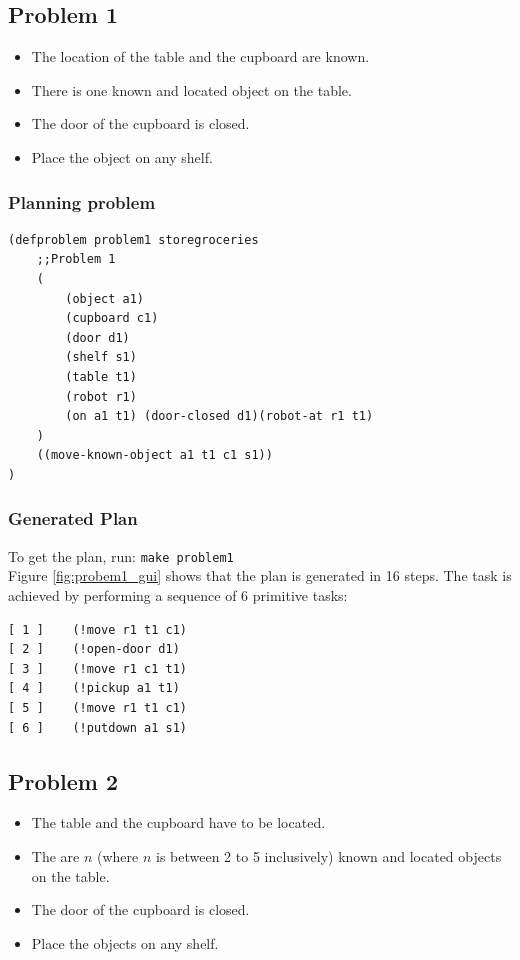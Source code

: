 \documentclass[paper=a4, fontsize=11pt]{scrartcl}
\begin{document}
	\subsection{Problem 1}

	\begin{itemize}
		\item The location of the table and the cupboard are known.
		\item There is one known and located object on the table.
		\item The door of the cupboard is closed.
		\item Place the object on any shelf.
	\end{itemize}

	\newpage

	\subsubsection*{Planning problem}

	\begin{lstlisting}
(defproblem problem1 storegroceries
	;;Problem 1
	(
		(object a1)
		(cupboard c1)
		(door d1)
		(shelf s1)
		(table t1)
		(robot r1)
		(on a1 t1) (door-closed d1)(robot-at r1 t1)
	)
	((move-known-object a1 t1 c1 s1))
)
	\end{lstlisting}

	\subsubsection*{Generated Plan}

	To get the plan, run: \verb|make problem1| \\

	Figure \ref{fig:probem1_gui} shows that the plan is generated in 16 steps. The task is achieved by performing a sequence of 6 primitive tasks: \\

	\begin{lstlisting}
[ 1 ]    (!move r1 t1 c1)
[ 2 ]    (!open-door d1)
[ 3 ]    (!move r1 c1 t1)
[ 4 ]    (!pickup a1 t1)
[ 5 ]    (!move r1 t1 c1)
[ 6 ]    (!putdown a1 s1)
	\end{lstlisting}

	\subsection{Problem 2}

	\begin{itemize}
		\item The table and the cupboard have to be located.
        \item The are $n$ (where $n$ is between 2 to 5 inclusively) known and located objects on the table.
		\item The door of the cupboard is closed.
		\item Place the objects on any shelf.
	\end{itemize}
\end{document}
